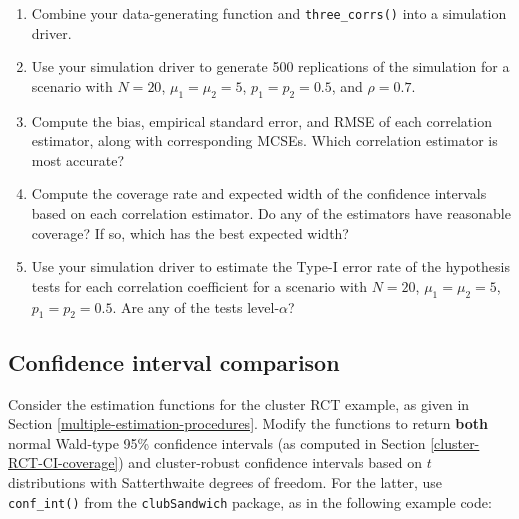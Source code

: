 \documentclass[
]{book}
\begin{document}
\begin{enumerate}
\def\labelenumi{\arabic{enumi}.}
\item
  Combine your data-generating function and \texttt{three\_corrs()} into a simulation driver.
\item
  Use your simulation driver to generate 500 replications of the simulation for a scenario with \(N = 20\), \(\mu_1 = \mu_2 = 5\), \(p_1 = p_2 = 0.5\), and \(\rho = 0.7\).
\item
  Compute the bias, empirical standard error, and RMSE of each correlation estimator, along with corresponding MCSEs. Which correlation estimator is most accurate?
\item
  Compute the coverage rate and expected width of the confidence intervals based on each correlation estimator. Do any of the estimators have reasonable coverage? If so, which has the best expected width?
\item
  Use your simulation driver to estimate the Type-I error rate of the hypothesis tests for each correlation coefficient for a scenario with \(N = 20\), \(\mu_1 = \mu_2 = 5\), \(p_1 = p_2 = 0.5\). Are any of the tests level-\(\alpha\)?
\end{enumerate}

\subsection{Confidence interval comparison}\label{cluster-RCT-t-confidence-intervals}

Consider the estimation functions for the cluster RCT example, as given in Section \ref{multiple-estimation-procedures}.
Modify the functions to return \textbf{both} normal Wald-type 95\% confidence intervals (as computed in Section \ref{cluster-RCT-CI-coverage}) and cluster-robust confidence intervals based on \(t\) distributions with Satterthwaite degrees of freedom.
For the latter, use \texttt{conf\_int()} from the \texttt{clubSandwich} package, as in the following example code:
\end{document}
